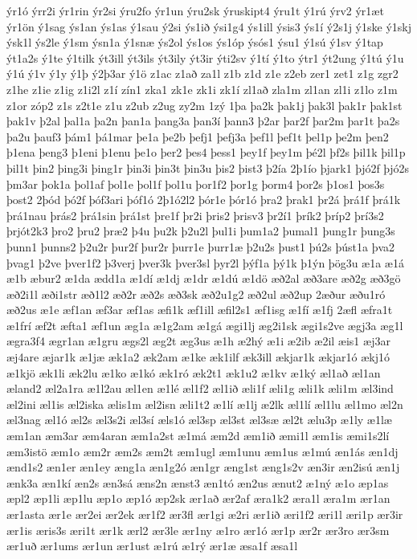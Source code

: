 {ýr1ó
ýrr2i
ýr1rin
ýr2si
ýru2fo
ýr1un
ýru2sk
ýruskipt4
ýru1t
ý1rú
ýrv2
ýr1æt
ýr1ön
ý1sag
ýs1an
ýs1as
ý1sau
ý2si
ýs1ið
ýsi1g4
ýs1ill
ýsis3
ýs1í
ý2s1j
ý1ske
ý1skj
ýsk1l
ýs2le
ý1sm
ýsn1a
ý1snæ
ýs2ol
ýs1os
ýs1óp
ýsós1
ýsu1
ý1sú
ý1sv
ý1tap
ýt1a2s
ý1te
ý1tilk
ýt3ill
ýt3ils
ýt3ily
ýt3ir
ýti2sv
ý1tí
ý1to
ýtr1
ýt2ung
ý1tú
ý1u
ý1ú
ý1v
ý1y
ý1þ
ý2þ3ar
ý1ö
z1ac
z1að
za1l
z1b
z1d
z1e
z2eb
zer1
zet1
z1g
zgr2
z1he
z1ie
z1ig
z1i2l
z1í
zín1
zka1
zk1e
zk1i
zk1í
zl1að
zla1m
zl1an
zl1i
z1lo
z1m
z1or
zóp2
z1s
z2t1e
z1u
z2ub
z2ug
zy2m
1zý
1þa
þa2k
þak1j
þak3l
þak1r
þak1st
þak1v
þ2al
þal1a
þa2n
þan1a
þang3a
þan3í
þann3
þ2ar
þar2f
þar2m
þar1t
þa2s
þa2u
þauf3
þám1
þá1mar
þe1a
þe2b
þefj1
þefj3a
þef1l
þef1t
þel1p
þe2m
þen2
þ1ena
þeng3
þ1eni
þ1enu
þe1o
þer2
þes4
þess1
þey1f
þey1m
þé2l
þf2s
þil1k
þil1p
þil1t
þin2
þing3i
þing1r
þin3i
þin3t
þin3u
þis2
þist3
þ2ía
2þ1ío
þjark1
þjó2f
þjó2s
þm3ar
þok1a
þol1af
þol1e
þol1f
þol1u
þor1f2
þor1g
þorm4
þor2s
þ1os1
þos3s
þost2
2þód
þó2f
þóf3ari
þóf1ó
2þ1ó2l2
þór1e
þór1ó
þra2
þrak1
þr2á
þrá1f
þrá1k
þrá1nau
þrás2
þrá1sin
þrá1st
þre1f
þr2i
þris2
þrisv3
þr2í1
þrík2
þríp2
þrí3s2
þrjót2k3
þro2
þru2
þræ2
þ4u
þu2k
þ2u2l
þul1i
þum1a2
þumal1
þung1r
þung3s
þunn1
þunns2
þ2u2r
þur2f
þur2r
þurr1e
þurr1æ
þ2u2s
þust1
þú2s
þúst1a
þva2
þvag1
þ2ve
þver1f2
þ3verj
þver3k
þver3sl
þyr2l
þýf1a
þý1k
þ1ýn
þög3u
æ1a
æ1á
æ1b
æbur2
æ1da
ædd1a
æ1dí
æ1dj
æ1dr
æ1dú
æ1dö
æð2al
æð3are
æð2g
æð3gö
æð2i1l
æði1str
æð1l2
æð2r
æð2s
æð3sk
æð2u1g2
æð2ul
æð2up
2æður
æðu1ró
æð2us
æ1e
æf1an
æf3ar
æf1as
æfi1k
æf1ill
æfil2s1
æf1isg
æ1fí
æ1fj
2æfl
æfra1t
æ1frí
æf2t
æfta1
æf1un
æg1a
æ1g2am
æ1gá
ægi1lj
æg2i1sk
ægi1s2ve
ægj3a
æg1l
ægra3f4
ægr1an
æ1gru
ægs2l
æg2t
æg3us
æ1h
æ2hý
æ1i
æ2ib
æ2il
æis1
æj3ar
æj4are
æjar1k
æ1jæ
æk1a2
æk2am
æ1ke
æk1ilf
æk3ill
ækjar1k
ækjar1ó
ækj1ó
æ1kjö
æk1li
æk2lu
æ1ko
æ1kó
æk1ró
æk2t1
æk1u2
æ1kv
æ1ký
æl1að
æl1an
æland2
æl2a1ra
æ1l2au
æl1en
æ1lé
æl1f2
æl1ið
æli1f
æli1g
æli1k
æli1m
æl3ind
æl2ini
æl1is
æl2iska
ælis1m
æl2isn
æli1t2
æ1lí
æ1lj
æ2lk
æl1lí
æl1lu
æl1mo
æl2n
æl3nag
æl1ó
æl2s
æl3s2i
æl3sí
æls1ó
æl3sp
æl3st
æl3sæ
æl2t
ælu3p
æ1ly
æ1læ
æm1an
æm3ar
æm4aran
æm1a2st
æ1má
æm2d
æm1ið
æmi1l
æm1is
æmi1s2lí
æm3istö
æm1o
æm2r
æm2s
æm2t
æm1ugl
æm1unu
æm1us
æ1mú
æn1ás
æn1dj
ænd1s2
æn1er
æn1ey
æng1a
æn1g2ó
æn1gr
æng1st
æng1s2v
æn3ir
æn2isú
æn1j
ænk3a
æn1kí
æn2s
æn3sá
æns2n
ænst3
æn1tó
æn2us
ænut2
æ1ný
æ1o
æp1as
æpl2
æp1li
æp1lu
æp1o
æp1ó
æp2sk
ær1að
ær2af
æra1k2
æra1l
æra1m
ær1an
ær1asta
ær1e
ær2ei
ær2ek
ær1f2
ær3fl
ær1gi
æ2ri
ær1ið
æri1f2
æri1l
æri1p
ær3ir
ær1is
æris3s
æri1t
ær1k
ærl2
ær3le
ær1ny
æ1ro
ær1ó
ær1p
ær2r
ær3ro
ær3sm
ær1uð
ær1ums
ær1un
ær1ust
æ1rú
æ1rý
ær1æ
æsa1f
æsa1l
}
